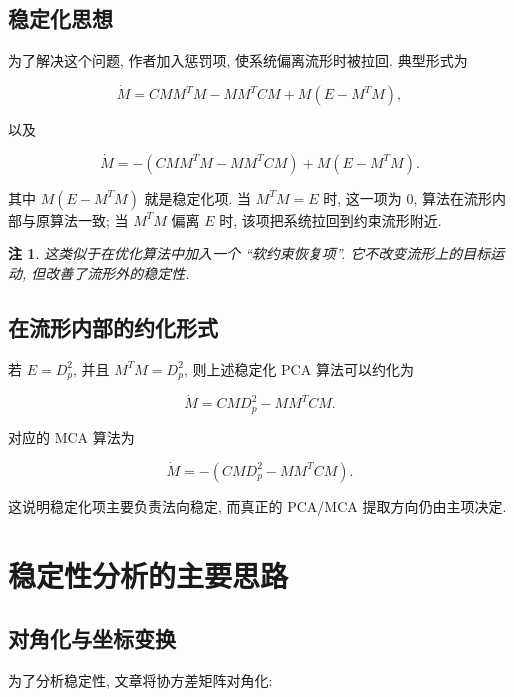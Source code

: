 \documentclass[oneside]{ctexart}
\newtheorem{remark}{注}[section]
\begin{document}
\subsection{稳定化思想}

为了解决这个问题, 作者加入惩罚项, 使系统偏离流形时被拉回. 典型形式为

\begin{equation}
    \dot{M}=CMM^TM-MM^TCM+M(E-M^TM),
\end{equation}

以及

\begin{equation}
    \dot{M}=-(CMM^TM-MM^TCM)+M(E-M^TM).
\end{equation}

其中 $M(E-M^TM)$ 就是稳定化项. 当 $M^TM=E$ 时, 这一项为 $0$, 算法在流形内部与原算法一致; 当 $M^TM$ 偏离 $E$ 时, 该项把系统拉回到约束流形附近.

\begin{remark}
    这类似于在优化算法中加入一个 ``软约束恢复项''. 它不改变流形上的目标运动, 但改善了流形外的稳定性.
\end{remark}

\subsection{在流形内部的约化形式}

若 $E=D_p^2$, 并且 $M^TM=D_p^2$, 则上述稳定化 PCA 算法可以约化为

\begin{equation}
    \dot{M}=CMD_p^2-MM^TCM.
\end{equation}

对应的 MCA 算法为

\begin{equation}
    \dot{M}=-(CMD_p^2-MM^TCM).
\end{equation}

这说明稳定化项主要负责法向稳定, 而真正的 PCA/MCA 提取方向仍由主项决定.

\section{稳定性分析的主要思路}

\subsection{对角化与坐标变换}

为了分析稳定性, 文章将协方差矩阵对角化:
\end{document}
